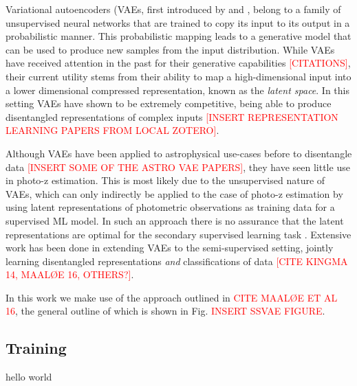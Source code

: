 Variational autoencoders (VAEs, first introduced by \cite{kingmaAutoEncodingVariationalBayes2022} and \cite{rezendeStochasticBackpropagationApproximate2014}, belong to a family of unsupervised neural networks that are trained to copy its input to its output in a probabilistic manner. This probabilistic mapping leads to a generative model that can be used to produce new samples from the input distribution. While VAEs have received attention in the past for their generative capabilities \textcolor{red}{[CITATIONS]}, their current utility stems from their ability to map a high-dimensional input into a lower dimensional compressed representation, known as the \textit{latent space}. In this setting VAEs have shown to be extremely competitive, being able to produce disentangled representations of complex inputs \textcolor{red}{[INSERT REPRESENTATION LEARNING PAPERS FROM LOCAL ZOTERO]}. 

Although VAEs have been applied to astrophysical use-cases before to disentangle data \textcolor{red}{[INSERT SOME OF THE ASTRO VAE PAPERS]}, they have seen little use in photo-z estimation. This is most likely due to the unsupervised nature of VAEs, which can only indirectly be applied to the case of photo-z estimation by using latent representations of photometric observations as training data for a supervised ML model. In such an approach there is no assurance that the latent representations are optimal for the secondary supervised learning task \citep{kingmaSemiSupervisedLearningDeep2014}. Extensive work has been done in extending VAEs to the semi-supervised setting, jointly learning disentangled representations \textit{and} classifications of data \textcolor{red}{[CITE KINGMA 14, MAALØE 16, OTHERS?]}.

In this work we make use of the approach outlined in \textcolor{red}{CITE MAALØE ET AL 16}, the general outline of which is shown in Fig. \textcolor{red}{INSERT SSVAE FIGURE}.


\subsection{Training}
\label{subsec:training}

hello world